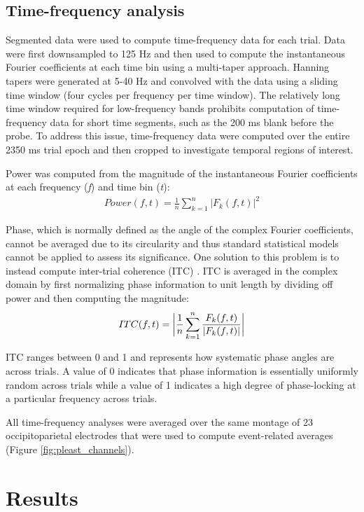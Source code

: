 \documentclass[dwyatte_dissertation.tex]{subfiles}
\begin{document}
\subsection{Time-frequency analysis}
Segmented data were used to compute time-frequency data for each trial. Data were first downsampled to 125 Hz and then used to compute the instantaneous Fourier coefficients at each time bin using a multi-taper approach. Hanning tapers were generated at 5-40 Hz and convolved with the data using a sliding time window (four cycles per frequency per time window). The relatively long time window required for low-frequency bands prohibits computation of time-frequency data for short time segments, such as the 200 ms blank before the probe. To address this issue, time-frequency data were computed over the entire 2350 ms trial epoch and then cropped to investigate temporal regions of interest.

Power was computed from the magnitude of the instantaneous Fourier coefficients at each frequency (\textit{f}) and time bin (\textit{t}):
\begin{align*}
Power(f,t) = \frac{1}{n} \sum_{k=1}^{n}{|F_k(f,t)|}^2
\end{align*}

Phase, which is normally defined as the angle of the complex Fourier coefficients, cannot be averaged due to its circularity and thus standard statistical models cannot be applied to assess its significance. One solution to this problem is to instead compute inter-trial coherence (ITC) \cite{LachauxRodriguezMartinerieEtAl99}. ITC is averaged in the complex domain by first normalizing phase information to unit length by dividing off power and then computing the magnitude:
\begin{align*}
ITC(f,t) = \bigg{|}\frac{1}{n} \sum_{k=1}^{n}{\frac{F_k(f,t)}{|F_k(f,t)|}}\bigg{|}
\end{align*}

ITC ranges between 0 and 1 and represents how systematic phase angles are across trials. A value of 0 indicates that phase information is essentially uniformly random across trials while a value of 1 indicates a high degree of phase-locking at a particular frequency across trials.

All time-frequency analyses were averaged over the same montage of 23 occipitoparietal electrodes that were used to compute event-related averages (Figure \ref{fig:pleast_channels}). 

\section{Results}
\end{document}
